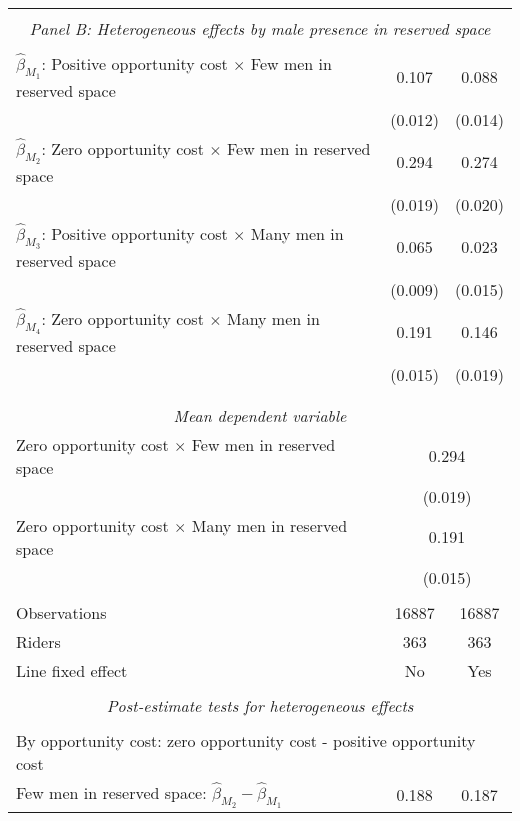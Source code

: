 \begin{tabular}{l*{2}{c}}
\hline \\[-1ex] \multicolumn{3}{c}{\textit{Panel B: Heterogeneous effects by male presence in reserved space}} \\\\[-1ex]
$\hat\beta_{M_1}$: Positive opportunity cost $\times$ Few men in reserved space&       0.107\sym{***}&       0.088\sym{***}\\
                    &     (0.012)         &     (0.014)         \\
[1em]
$\hat\beta_{M_2}$: Zero opportunity cost $\times$ Few men in reserved space&       0.294\sym{***}&       0.274\sym{***}\\
                    &     (0.019)         &     (0.020)         \\
[1em]
$\hat\beta_{M_3}$: Positive opportunity cost $\times$ Many men in reserved space&       0.065\sym{***}&       0.023         \\
                    &     (0.009)         &     (0.015)         \\
[1em]
$\hat\beta_{M_4}$: Zero opportunity cost $\times$ Many men in reserved space&       0.191\sym{***}&       0.146\sym{***}\\
                    &     (0.015)         &     (0.019)         \\
\\[-1.8ex] \hline \\[-1.8ex] \multicolumn{3}{c}{\textit{Mean dependent variable}} \\ Zero opportunity cost $\times$ Few men in reserved space & \multicolumn{2}{c}{0.294} \\ & \multicolumn{2}{c}{(0.019)} \\ Zero opportunity cost $\times$ Many men in reserved space & \multicolumn{2}{c}{0.191} \\ & \multicolumn{2}{c}{(0.015)} \\\\[-1ex] 
Observations        &       16887         &       16887         \\
Riders              &         363         &         363         \\
Line fixed effect   &          No         &         Yes         \\
\hline \\[-1ex]  \multicolumn{3}{c}{\textit{Post-estimate tests for heterogeneous effects}} \\\\[-1ex] \multicolumn{3}{l}{By opportunity cost: zero opportunity cost - positive opportunity cost} \\ \quad Few men in reserved space: $\hat\beta_{M_2} - \hat\beta_{M_1}$&       0.188         &       0.187         \\

\end{tabular}
